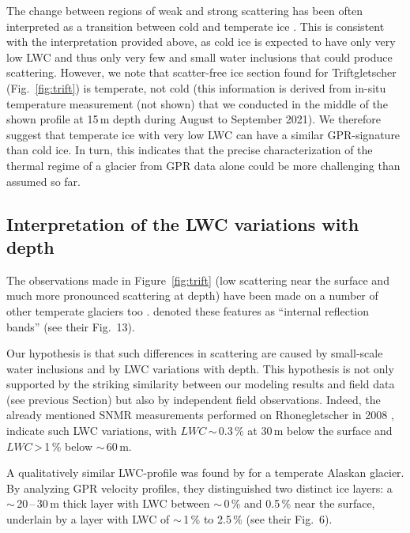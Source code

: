 The change between regions of weak and strong scattering has been often interpreted as a transition between cold and temperate ice \citep[e.g.][]{Moore&al1999,Blatter&Hutter1991,Bjornsson&el1996}. This is consistent with the interpretation provided above, as cold ice is expected to have only very low LWC and thus only very few and small water inclusions that could produce scattering. However, we note that scatter-free ice section found for Triftgletscher (Fig.~\ref{fig:trift}) is temperate, not cold (this information is derived from in-situ temperature measurement (not shown) that we conducted in the middle of the shown profile at 15\,m depth during August to September 2021). We therefore suggest that temperate ice with very low LWC can have a similar GPR-signature than cold ice. In turn, this indicates that the precise characterization of the thermal regime of a glacier from GPR data alone could be more challenging than assumed so far.  

\subsection{Interpretation of the LWC variations with depth}
\label{sec:LWC_GPR}

The observations made in Figure~\ref{fig:trift} (low scattering near the surface and much more pronounced scattering at depth) have been made on a number of other temperate glaciers too \citep[see, e.g.,][and references therein]{Rutishauser&al2016}. \cite{Rutishauser&al2016} denoted these features as “internal reflection bands” (see their Fig.~13).

Our hypothesis is that such differences in scattering are caused by small-scale water inclusions and by LWC variations with depth. This hypothesis is not only supported by the striking similarity between our modeling results and field data (see previous Section) but also by independent field observations. Indeed, the already mentioned SNMR measurements performed on Rhonegletscher in 2008 \citep{Hertrich&Walbrecker2008}, indicate such LWC variations, with $LWC$\,$\sim$\,0.3\,\% at 30\,m below the surface and $LWC$\,>\,1\,\% below $\sim$\,60\,m. 

A qualitatively similar LWC-profile was found by \cite{Bradford&al2009} for a temperate Alaskan glacier. By analyzing GPR velocity profiles, they distinguished two distinct ice layers: a $\sim$\,20\,--\,30\,m thick layer with LWC between $\sim$\,0\,\% and 0.5\,\% near the surface, underlain by a layer with LWC of $\sim$\,1\,\% to 2.5\,\% (see their Fig.~6).

